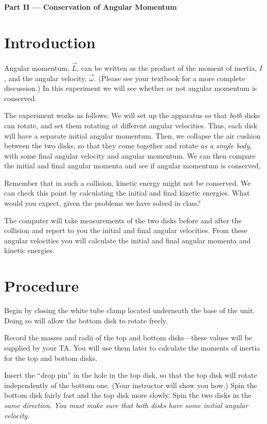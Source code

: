 \begin{center}
{\Large {\bf Part II --- Conservation of Angular Momentum}}
\end{center}
\section*{Introduction}
Angular momentum, $\vec{L}$, can be written as the product of the moment of inertia,
$I$, and the angular velocity, $\vec{\omega}$. (Please see your
textbook for a more complete discussion.) In this experiment we will
see whether or not angular momentum is conserved.

The experiment works as follows:  We will set up the apparatus so that
{\em both} disks can rotate, and set them rotating at different
angular velocities.  Thus, each disk will have a separate
initial angular
momentum.  Then, we collapse the air cushion between the two disks, so
that they come together and rotate {\em as a single body}, with some
final angular velocity and angular momentum.  We can then
compare the initial and final angular momenta and see if
angular momentum is conserved,

Remember that in such a collision, kinetic energy might not be
conserved.  We can check this point by calculating the initial and
final kinetic energies.  What would you expect, given the problems we
have solved in class?

The computer will take measurements of the
two disks before and after the collision and report to you the initial and final
angular velocities.  From these angular velocities you will calculate the
initial and final angular momenta and kinetic energies.

\section*{Procedure}
Begin by closing the white tube clamp located underneath the base of the unit.
Doing so will allow the bottom disk to rotate freely.

Record the masses and radii of the top and bottom disks---these values will
be supplied by your TA.  You will use
them later to calculate the moments of inertia for the top and bottom disks.

Insert the ``drop pin'' in the hole in the top disk, so that the top
disk will rotate independently of the bottom one.  (Your instructor
will show you how.) Spin the bottom disk fairly fast and the top disk
more slowly.  Spin the two disks in the {\em same direction}.  {\em
You must make sure that both disks have some initial angular
velocity}.


